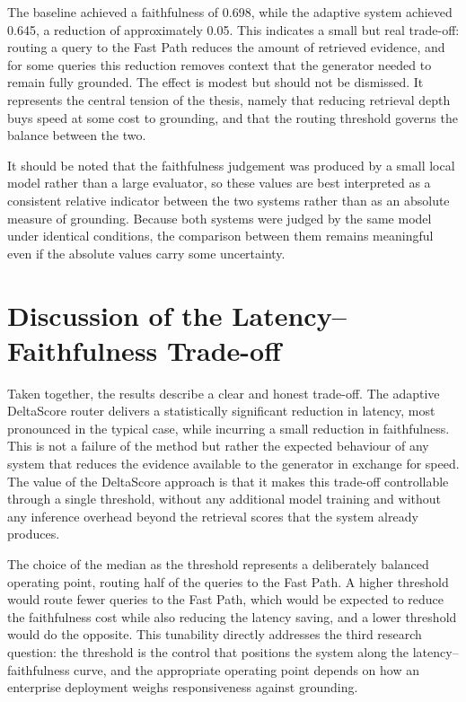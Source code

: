 \documentclass[12pt, a4paper, oneside]{report}
\begin{document}
The baseline achieved a faithfulness of 0.698, while the adaptive system achieved 0.645, a reduction of approximately 0.05. This indicates a small but real trade-off: routing a query to the Fast Path reduces the amount of retrieved evidence, and for some queries this reduction removes context that the generator needed to remain fully grounded. The effect is modest but should not be dismissed. It represents the central tension of the thesis, namely that reducing retrieval depth buys speed at some cost to grounding, and that the routing threshold governs the balance between the two.

It should be noted that the faithfulness judgement was produced by a small local model rather than a large evaluator, so these values are best interpreted as a consistent relative indicator between the two systems rather than as an absolute measure of grounding. Because both systems were judged by the same model under identical conditions, the comparison between them remains meaningful even if the absolute values carry some uncertainty.

\section{Discussion of the Latency--Faithfulness Trade-off}

Taken together, the results describe a clear and honest trade-off. The adaptive DeltaScore router delivers a statistically significant reduction in latency, most pronounced in the typical case, while incurring a small reduction in faithfulness. This is not a failure of the method but rather the expected behaviour of any system that reduces the evidence available to the generator in exchange for speed. The value of the DeltaScore approach is that it makes this trade-off controllable through a single threshold, without any additional model training and without any inference overhead beyond the retrieval scores that the system already produces.

The choice of the median as the threshold represents a deliberately balanced operating point, routing half of the queries to the Fast Path. A higher threshold would route fewer queries to the Fast Path, which would be expected to reduce the faithfulness cost while also reducing the latency saving, and a lower threshold would do the opposite. This tunability directly addresses the third research question: the threshold is the control that positions the system along the latency--faithfulness curve, and the appropriate operating point depends on how an enterprise deployment weighs responsiveness against grounding.
\end{document}
